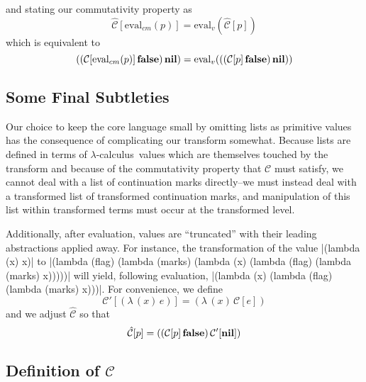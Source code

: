 \documentclass{llncs}
\newcommand{\lc}[0]{$\lambda$-calculus}
\newcommand{\app}[2]{(#1\,#2)}
\newcommand{\abs}[2]{(\lambda\,(#1)\,#2)}
\newcommand{\C}[1]{\mathcal{C}[#1]}
\newcommand{\Cp}[1]{\mathcal{C}'[#1]}
\newcommand{\Ch}[1]{\hat{\mathcal{C}}[#1]}
\newcommand{\evalv}[1]{\mathrm{eval}_v(#1)}
\newcommand{\evalcm}[1]{\mathrm{eval}_{cm}(#1)}
\begin{document}
and stating our commutativity property as
\begin{equation}
\label{commutativity-property}
\Ch{\evalcm{p}}=\evalv{\Ch{p}}
\end{equation}
which is equivalent to
\begin{equation}
\app{\app{\C{\evalcm{p}}}{\false}}{\nil}=\evalv{\app{\app{\C{p}}{\false}}{\nil}}
\end{equation}

\subsection{Some Final Subtleties}

Our choice to keep the core language small by omitting lists as primitive values has the consequence of complicating our transform somewhat. Because lists are defined in terms of \lc\ values which are themselves touched by the transform and because of the commutativity property that $\mathcal{C}$ must satisfy, we cannot deal with a list of continuation marks directly--we must instead deal with a transformed list of transformed continuation marks, and manipulation of this list within transformed terms must occur at the transformed level.

Additionally, after evaluation, values are ``truncated'' with their leading abstractions applied away. For instance, the transformation of the value \scheme|(lambda (x) x)| to \scheme|(lambda (flag) (lambda (marks) (lambda (x) (lambda (flag) (lambda (marks) x)))))| will yield, following evaluation, \scheme|(lambda (x) (lambda (flag) (lambda (marks) x)))|. For convenience, we define 
\begin{equation}
\Cp{\abs{x}{e}}=\abs{x}{\C{e}}
\end{equation}
and we adjust $\hat{\mathcal{C}}$ so that
\begin{equation}
\Ch{p}=\app{\app{\C{p}}{\false}}{\Cp{\nil}}
\end{equation}


\newenvironment{schemedefn}[1]{\begin{plaindef}#1}{\end{plaindef}}
\newenvironment{namedschemedefn}[2]{\begin{plaindef}\label{#1}$#2$}{\end{plaindef}}

\subsection{Definition of $\mathcal{C}$}
\end{document}
